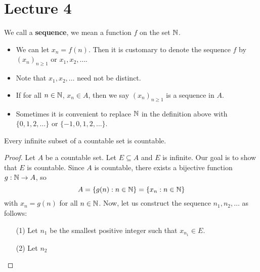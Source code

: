 \documentclass[a4paper]{report}
\begin{document}
\section{Lecture 4}

\begin{definition}[Sequence]
    We call a \textbf{sequence}, we mean a function \( f  \) on the set \( \mathbb{N}  \).    
\end{definition}

\begin{itemize}
    \item We can let \( {x}_{n} = f(n) \). Then it is customary to denote the sequence \( f  \) by \( ({x}_{n})_{n \geq 1} \) or \( {x}_{1}, {x}_{2}, \dots  \).
    \item Note that \( {x}_{1}, {x}_{2}, \dots  \) need not be distinct.
    \item If for all \( n \in \mathbb{N}  \), \( {x}_{n} \in A  \), then we say \( ({x}_{n})_{n \geq1} \) is a sequence in \( A  \).
    \item Sometimes it is convenient to replace \( \mathbb{N}  \) in the definition above with \( \{ 0,1,2,\dots \}  \) or \( \{ -1,0,1,2, \dots \}  \).
\end{itemize}

\begin{theorem}[ ] 
    Every infinite subset of a countable set is countable.
\end{theorem}

\begin{proof}
Let \( A  \) be a countable set. Let \( E \subseteq A  \) and \( E  \) is infinite. Our goal is to show that \( E  \) is countable. Since \( A  \) is countable, there exists a bijective function \( g: \mathbb{N} \to A  \), so 
\[  A = \{ g(n) : n \in \mathbb{N} \} = \{ {x}_{n} : n \in \mathbb{N} \} \]
with \( {x}_{n} = g(n) \) for all \( n \in \mathbb{N} \).
Now, let us construct the sequence \( {n}_{1}, {n}_{2}, \dots  \) as follows: 
\begin{enumerate}
    \item[(1)] Let \( {n}_{1}  \) be the smallest positive integer such that \( {x}_{{n}_{1}} \in E  \). 
    \item[(2)] Let \( {n}_{2} \) 
\end{enumerate}
\end{proof}

\begin{remark}
    
\end{remark}

\begin{corollary}[ ]
    
\end{corollary}
\end{document}
